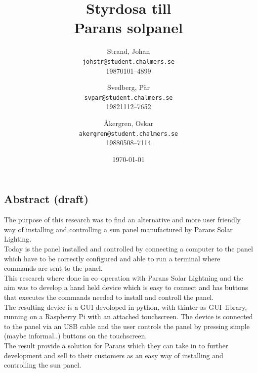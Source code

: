 \documentclass{article}
\author{    Strand, Johan \\ \texttt{johstr@student.chalmers.se} \\ 
            19870101--4899 \and
            Svedberg, Pär\\ \texttt{svpar@student.chalmers.se}  \\ 
            19821112--7652 \and
            Åkergren, Oskar\\ \texttt{akergren@student.chalmers.se}  \\ 19880508--7114
}
\title{\vspace{2cm} Styrdosa till \\ Parans solpanel  \vspace{1cm}}
\date{\vspace{8cm}\today}
\begin{document}
    \maketitle
    \thispagestyle{empty}

    \newpage 
    \subsection*{Abstract (draft)} %
    \label{sub:abstract}
            The purpose of this research was to find an alternative and more user friendly way of installing and controlling a sun panel manufactured by Parans Solar Lighting. \\

            \noindent Today is the panel installed and controlled by connecting a computer to the panel which have to be correctly configured and able to run a terminal where commands are sent to the panel.\\

            \noindent This research where done in co--operation with Parans Solar Lightning and the aim was to develop a hand held device which is easy to connect and has buttons that executes the commands needed to install and controll the panel.\\

            \noindent The resulting device is a GUI devoloped in python, with tkinter as GUI--library, running on a Raspberry Pi with an attached touchscreen. The device is connected to the panel via an USB cable and the user controls the panel by pressing simple (maybe informal..) buttons on the touchscreen.\\

            \noindent The result provide a solution for Parans which they can take in to further development and sell to their customers as an easy way of installing and controlling the sun panel.

    \newpage 
\end{document}
